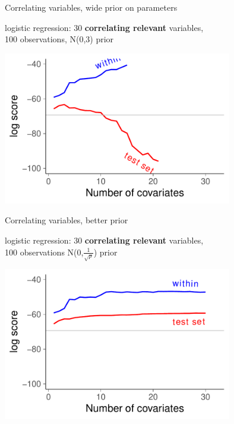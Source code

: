 \documentclass[english,t]{beamer}
\begin{document}
\begin{frame}{Correlating variables, wide prior on parameters}

  logistic regression: 30 \textbf{correlating relevant} variables, \\100
  observations, N(0,3) prior
  
  {\includegraphics[width=10cm]{correlating_N.pdf}}

\end{frame}

\begin{frame}{Correlating variables, better prior}

  logistic regression: 30 \textbf{correlating relevant} variables, \\100
  observations
  {N(0,$\frac{1}{\sqrt{p}}$) prior}
  
  {\includegraphics[width=10cm]{correlating_Ns.pdf}}

\end{frame}
\end{document}
